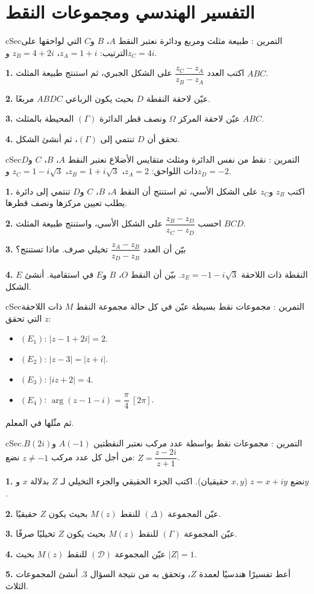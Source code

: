 \documentclass[12pt,a4paper]{article}
\newenvironment{BOX}[2]{\begin{otherlanguage}{english}\begin{arbox}{#1}{#2}}{\end{arbox}\end{otherlanguage}}
\newcounter{exo}
\newenvironment{tamrin}[1]{\stepcounter{exo}\begin{BOX}{cSec}{التمرين \theexo: #1}}{\end{BOX}}
\newenvironment{sq}{\begin{itemize}[leftmargin=2.4em,itemsep=3pt]}{\end{itemize}}
\newcommand{\qa}{\item[(أ)]}\newcommand{\qb}{\item[(ب)]}\newcommand{\qc}{\item[(جـ)]}\newcommand{\qd}{\item[(د)]}\newcommand{\qe}{\item[(هـ)]}
\newcommand{\QQ}[1]{\par\smallskip\textbf{#1.} }
\begin{document}
\section{التفسير الهندسي ومجموعات النقط}

\begin{tamrin}{طبيعة مثلث ومربع ودائرة}
نعتبر النقط $A$، $B$ و$C$ التي لواحقها على الترتيب: $z_A=1+i$، $z_B=4+2i$ و$z_C=4i$.
\QQ{1} اكتب العدد $\dfrac{z_C-z_A}{z_B-z_A}$ على الشكل الجبري، ثم استنتج طبيعة المثلث $ABC$.
\QQ{2} عيّن لاحقة النقطة $D$ بحيث يكون الرباعي $ABDC$ مربعًا.
\QQ{3} عيّن لاحقة المركز $\Omega$ ونصف قطر الدائرة $(\Gamma)$ المحيطة بالمثلث $ABC$.
\QQ{4} تحقق أن $D$ تنتمي إلى $(\Gamma)$، ثم أنشئ الشكل.
\end{tamrin}

\begin{tamrin}{نقط من نفس الدائرة ومثلث متقايس الأضلاع}
نعتبر النقط $A$، $B$، $C$ و$D$ ذات اللواحق: $z_A=2$، $z_B=1+i\sqrt3$، $z_C=1-i\sqrt3$ و$z_D=-2$.
\QQ{1} اكتب $z_B$ و$z_C$ على الشكل الأسي، ثم استنتج أن النقط $A$، $B$، $C$ و$D$ تنتمي إلى دائرة يطلب تعيين مركزها ونصف قطرها.
\QQ{2} احسب $\dfrac{z_B-z_D}{z_C-z_D}$ على الشكل الأسي، واستنتج طبيعة المثلث $BCD$.
\QQ{3} بيّن أن العدد $\dfrac{z_A-z_B}{z_D-z_B}$ تخيلي صرف. ماذا تستنتج؟
\QQ{4} $E$ النقطة ذات اللاحقة $z_E=-1-i\sqrt3$. بيّن أن النقط $O$، $B$ و$E$ في استقامية. أنشئ الشكل.
\end{tamrin}

\begin{tamrin}{مجموعات نقط بسيطة}
عيّن في كل حالة مجموعة النقط $M$ ذات اللاحقة $z$ التي تحقق:
\begin{sq}
\qa $(E_1)$: $|z-1+2i|=2$.
\qb $(E_2)$: $|z-3|=|z+i|$.
\qc $(E_3)$: $|iz+2|=4$.
\qd $(E_4)$: $\arg(z-1-i)=\dfrac\pi4\ [2\pi]$.
\end{sq}
ثم مثّلها في المعلم.
\end{tamrin}

\begin{tamrin}{مجموعات نقط بواسطة عدد مركب}
نعتبر النقطتين $A(-1)$ و$B(2i)$. من أجل كل عدد مركب $z\neq-1$ نضع: $Z=\dfrac{z-2i}{z+1}$.
\QQ{1} نضع $z=x+iy$ ($x,y$ حقيقيان). اكتب الجزء الحقيقي والجزء التخيلي لـ $Z$ بدلالة $x$ و$y$.
\QQ{2} عيّن المجموعة $(\Delta)$ للنقط $M(z)$ بحيث يكون $Z$ حقيقيًا.
\QQ{3} عيّن المجموعة $(\Gamma)$ للنقط $M(z)$ بحيث يكون $Z$ تخيليًا صرفًا.
\QQ{4} عيّن المجموعة $(\mathcal D)$ للنقط $M(z)$ بحيث $|Z|=1$.
\QQ{5} أعط تفسيرًا هندسيًا لعمدة $Z$، وتحقق به من نتيجة السؤال 3. أنشئ المجموعات الثلاث.
\end{tamrin}
\end{document}
